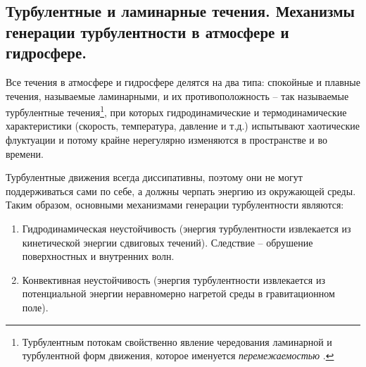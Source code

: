 \subsection{Турбулентные и ламинарные течения. Механизмы генерации турбулентности в атмосфере и гидросфере.}
Все течения в атмосфере и гидросфере делятся на два типа: спокойные и плавные течения, называемые ламинарными, и их противоположность -- так называемые турбулентные течения\footnote{Турбулентным потокам свойственно явление чередования ламинарной и турбулентной форм движения, которое именуется \textit{перемежаемостью} \cite{Носов-2013}.}, при которых гидродинамические и термодинамические характеристики (скорость, температура, давление и т.д.) испытывают хаотические флуктуации и потому крайне нерегулярно изменяются в пространстве и во времени.

Турбулентные движения всегда диссипативны, поэтому они не могут поддерживаться сами по себе, а должны черпать энергию из окружающей среды.
Таким образом, основными механизмами генерации турбулентности являются:
\begin{enumerate}
\item Гидродинамическая неустойчивость (энергия турбулентности извлекается из кинетической энергии сдвиговых течений). Следствие -- обрушение поверхностных и внутренних волн.
\item Конвективная неустойчивость (энергия турбулентности извлекается из потенциальной энергии неравномерно нагретой среды в гравитационном поле).
\end{enumerate}
